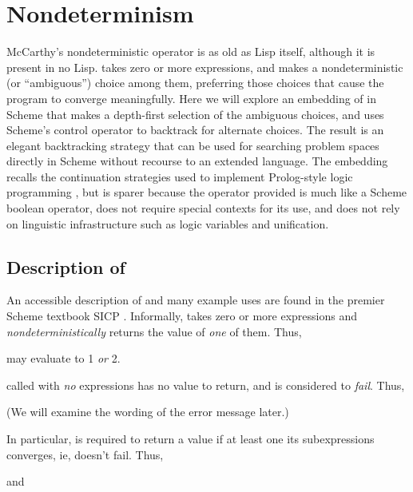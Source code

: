 \chapter{Nondeterminism}

McCarthy's nondeterministic operator
 \cite{jmc:amb,wc:amb,zmc:amb} is as old as
Lisp itself, although it is present in no Lisp.
 takes zero or more expressions, and makes a
nondeterministic (or ``ambiguous'') choice among them,
preferring those choices that cause the program to
converge meaningfully.  Here we will explore an
embedding of  in Scheme that makes a depth-first
selection of the ambiguous choices, and uses Scheme's
control operator  to backtrack for alternate
choices.  The result is an elegant backtracking
strategy that can be used for searching problem spaces
directly in Scheme without recourse to an extended
language.  The embedding recalls the continuation
strategies used to implement Prolog-style logic
programming \cite{logick,mf:prolog}, but is sparer because the
operator provided is much like a Scheme boolean
operator, does not require special contexts for its
use, and does not rely on linguistic infrastructure
such as logic variables and unification.

\section{Description of }

An accessible description of  and many example
uses are found in the premier Scheme textbook
SICP \cite{sicp}.  Informally,
 takes zero or more expressions and {\em
nondeterministically} returns the value of {\em one} of
them.  Thus,


\n may evaluate to 1 {\em or} 2.

 called with {\em no} expressions has no
value to return, and is considered to {\em fail}.
Thus,


\n (We will examine the wording of the error message later.)

In particular,  is required to return a value if at
least one its subexpressions converges, ie, doesn't fail.
Thus,


\n and

